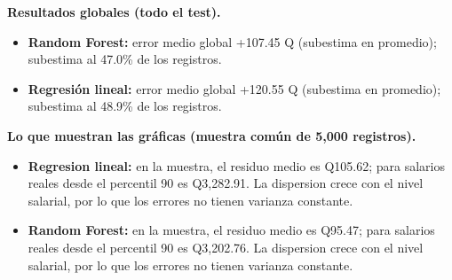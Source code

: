 \textbf{Resultados globales (todo el test).}

\begin{itemize}\setlength{\itemsep}{2pt}
\item \textbf{Random Forest:} error medio global +107.45 Q (subestima en promedio); subestima al 47.0\% de los registros.
\item \textbf{Regresión lineal:} error medio global +120.55 Q (subestima en promedio); subestima al 48.9\% de los registros.
\end{itemize}

\textbf{Lo que muestran las gráficas (muestra común de 5,000 registros).}

\begin{itemize}\setlength{\itemsep}{2pt}
\item \textbf{Regresion lineal:} en la muestra, el residuo medio es Q105.62; para salarios reales desde el percentil 90 es Q3,282.91. La dispersion crece con el nivel salarial, por lo que los errores no tienen varianza constante.
\item \textbf{Random Forest:} en la muestra, el residuo medio es Q95.47; para salarios reales desde el percentil 90 es Q3,202.76. La dispersion crece con el nivel salarial, por lo que los errores no tienen varianza constante.
\end{itemize}
